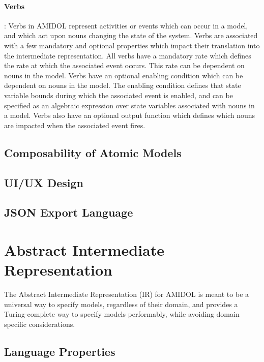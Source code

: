 \documentclass[11pt]{article}
\newcommand{\amidol}{\textsc{AMIDOL}}
\begin{document}
\paragraph{Verbs}: Verbs in \amidol{} represent activities or events which can occur in a model, and which act upon nouns changing the state of the system.  Verbs are associated with a few mandatory and optional properties which impact their translation into the intermediate representation.  All verbs have a mandatory rate which defines the rate at which the associated event occurs.  This rate can be dependent on nouns in the model.  Verbs have an optional enabling condition which can be dependent on nouns in the model.  The enabling condition defines that state variable bounds during which the associated event is enabled, and can be specified as an algebraic expression over state variables associated with nouns in a model.  Verbs also have an optional output function which defines which nouns are impacted when the associated event fires.

\subsection{Composability of Atomic Models}

\subsection{UI/UX Design}

\subsection{JSON Export Language}

\section{Abstract Intermediate Representation}

The Abstract Intermediate Representation (IR) for \amidol{} is meant to be a universal way to specify models, regardless of their domain, and provides a Turing-complete way to specify models performably, while avoiding domain specific considerations.

\subsection{Language Properties}
\end{document}
